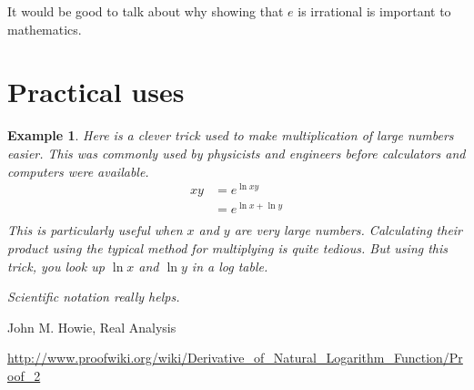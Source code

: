 \documentclass[12pt]{article}
\theoremstyle{mystyle}
\newtheorem{example}[thm]{Example}
\begin{document}
It would be good to talk about why showing that $e$ is irrational is important
to mathematics.

\section{Practical uses}
\begin{example}
  Here is a clever trick used to make multiplication of large numbers easier.
  This was commonly used by physicists and engineers before calculators and
  computers were available. 
  \begin{align*}
    xy &= e^{\ln xy} \\
       &= e^{\ln x + \ln y} \\
  \end{align*}
  This is particularly useful when $x$ and $y$ are very large numbers.
  Calculating their product using the typical method for multiplying is quite
  tedious. But using this trick, you look up $\ln x$ and $\ln y$ in a log table.

  Scientific notation really helps.
\end{example}


\begin{thebibliography}{10}

John M. Howie, Real Analysis

\url{http://www.proofwiki.org/wiki/Derivative_of_Natural_Logarithm_Function/Proof_2}

\end{thebibliography}
\end{document}
